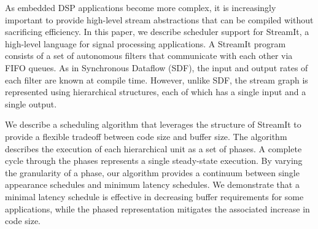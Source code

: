 As embedded DSP applications become more complex, it is increasingly
important to provide high-level stream abstractions that can be
compiled without sacrificing efficiency.  In this paper, we describe
scheduler support for StreamIt, a high-level language for signal
processing applications.  A StreamIt program consists of a set of
autonomous filters that communicate with each other via FIFO queues.
As in Synchronous Dataflow (SDF), the input and output rates of each
filter are known at compile time.  However, unlike SDF, the stream
graph is represented using hierarchical structures, each of which has
a single input and a single output.

We describe a scheduling algorithm that leverages the structure of
StreamIt to provide a flexible tradeoff between code size and buffer
size.  The algorithm describes the execution of each hierarchical unit
as a set of phases.  A complete cycle through the phases represents a
single steady-state execution.  By varying the granularity of a phase,
our algorithm provides a continuum between single appearance schedules
and minimum latency schedules.  We demonstrate that a minimal latency
schedule is effective in decreasing buffer requirements for some
applications, while the phased representation mitigates the associated
increase in code size.


